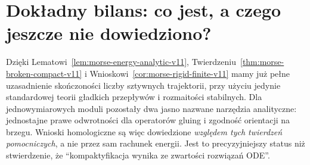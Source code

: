 \section{Dokładny bilans: co jest, a czego jeszcze nie dowiedziono?}
Dzięki Lematowi~\ref{lem:morse-energy-analytic-v11},
Twierdzeniu~\ref{thm:morse-broken-compact-v11} i
Wnioskowi~\ref{cor:morse-rigid-finite-v11} mamy już
pełne uzasadnienie skończoności liczby sztywnych trajektorii,
przy użyciu jedynie standardowej teorii gładkich przepływów
i rozmaitości stabilnych. Dla jednowymiarowych moduli
pozostały dwa jasno nazwane narzędzia analityczne:
jednostajne prawe odwrotności dla operatorów gluing i
zgodność orientacji na brzegu. Wnioski homologiczne są
więc dowiedzione \emph{względem tych twierdzeń pomocniczych},
a nie przez sam rachunek energii. Jest to precyzyjniejszy
status niż stwierdzenie, że ``kompaktyfikacja wynika
ze zwartości rozwiązań ODE''.



